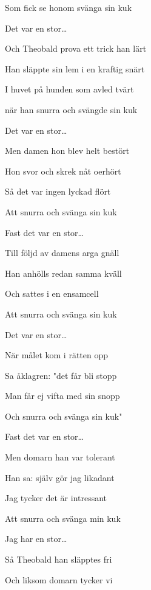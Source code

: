 Som fick se honom svänga sin kuk\bigskip



Det var en stor…\bigskip



Och Theobald prova ett trick han lärt

Han släppte sin lem i en kraftig snärt

I huvet på hunden som avled tvärt

när han snurra och svängde sin kuk\bigskip



Det var en stor…\bigskip



Men damen hon blev helt bestört

Hon svor och skrek nåt oerhört

Så det var ingen lyckad flört

Att snurra och svänga sin kuk\bigskip



Fast det var en stor…\bigskip



Till följd av damens arga gnäll

Han anhölls redan samma kväll

Och sattes i en ensamcell

Att snurra och svänga sin kuk\bigskip



Det var en stor…\bigskip



När målet kom i rätten opp

Sa åklagren: "det får bli stopp

Man får ej vifta med sin snopp

Och snurra och svänga sin kuk"\bigskip



Fast det var en stor…\bigskip



Men domarn han var tolerant

Han sa: själv gör jag likadant

Jag tycker det är intressant

Att snurra och svänga min kuk\bigskip



Jag har en stor…\bigskip



Så Theobald han släpptes fri

Och liksom domarn tycker vi

